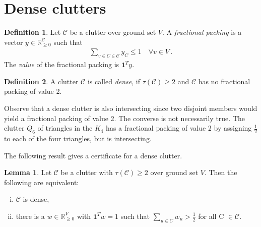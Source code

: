 \documentclass[a4paper, 12pt]{scrbook}
\theoremstyle{definition}
\newtheorem*{definition}{Definition}
\newtheorem{lemma}[theorem]{Lemma}
\newcommand*{\IR}{\ensuremath{\mathbb{R}}}
\begin{document}
\section{Dense clutters}
\begin{definition}
    Let $\mathcal{C}$ be a clutter over ground set $V$.
    A \emph{fractional packing} is a vector $y \in \IR_{\geq0}^{\mathcal{C}}$ such that
    \begin{align*}
        \sum_{v \in C \in \mathcal{C}} y_C \leq 1 \quad \forall v \in V \,.
    \end{align*}
    The \emph{value} of the fractional packing is $\textbf{1}^Ty$.
\end{definition}
\begin{definition}
    A clutter $\mathcal{C}$ is called \emph{dense}, if $\tau(\mathcal{C}) \geq 2$ and $\mathcal{C}$ has no fractional packing of value 2.
\end{definition}

Observe that a dense clutter is also intersecting since two disjoint members would yield a fractional packing of value 2.
The converse is not necessarily true.
The clutter $Q_6$ of triangles in the $K_4$ has a fractional packing of value 2 by assigning $\frac 12$ to each of the four triangles, but is intersecting.

The following result gives a certificate for a dense clutter.
\begin{lemma}\label{certificate}
    Let $\mathcal{C}$ be a clutter with $\tau(\mathcal{C})\geq 2$ over ground set $V$.
    Then the following are equivalent:
    \leavevmode
    \begin{enumerate}[(i)]
        \item $\mathcal{C}$ is dense,
        \item there is a $w \in \IR_{\geq 0}^V$ with $\textbf{1}^Tw=1$ such that $\sum_{u \in C} w_u > \frac 12$ for all C $\in \mathcal{C}$.
    \end{enumerate}
\end{lemma}
\end{document}
